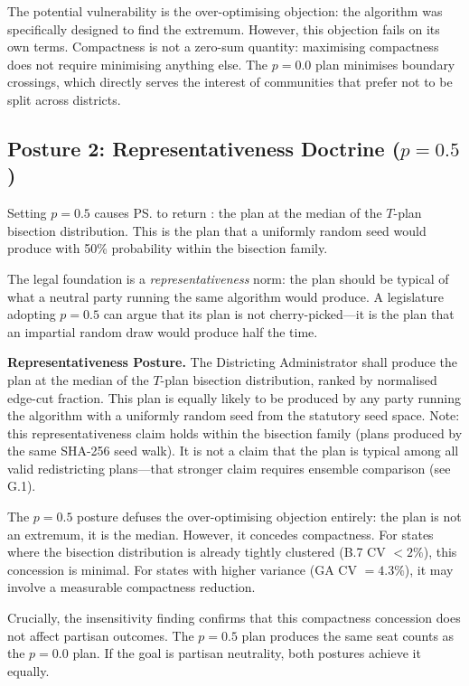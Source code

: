 The potential vulnerability is the over-optimising objection: the algorithm
was specifically designed to find the extremum.
However, this objection fails on its own terms.
Compactness is not a zero-sum quantity: maximising compactness does not
require minimising anything else.
The $p = 0.0$ plan minimises boundary crossings, which directly serves the
interest of communities that prefer not to be split across districts.

\subsection{Posture 2: Representativeness Doctrine ($p = 0.5$)}

Setting $p = 0.5$ causes \ps{} to return \ms{}: the plan at the median of
the $T$-plan bisection distribution.
This is the plan that a uniformly random seed would produce with 50\%
probability within the bisection family.

The legal foundation is a \emph{representativeness} norm: the plan should
be typical of what a neutral party running the same algorithm would produce.
A legislature adopting $p = 0.5$ can argue that its plan is not
cherry-picked---it is the plan that an impartial random draw would produce
half the time.

\begin{statute}
\textbf{Representativeness Posture.}
The Districting Administrator shall produce the plan at the median of the
$T$-plan bisection distribution, ranked by normalised edge-cut fraction.
This plan is equally likely to be produced by any party running the
algorithm with a uniformly random seed from the statutory seed space.
Note: this representativeness claim holds within the bisection family
(plans produced by the same SHA-256 seed walk).
It is not a claim that the plan is typical among all valid redistricting
plans---that stronger claim requires ensemble comparison (see G.1).
\end{statute}

The $p = 0.5$ posture defuses the over-optimising objection entirely: the
plan is not an extremum, it is the median.
However, it concedes compactness.
For states where the bisection distribution is already tightly clustered
(B.7 CV $< 2\%$), this concession is minimal.
For states with higher variance (GA CV $= 4.3\%$), it may involve a
measurable compactness reduction.

Crucially, the insensitivity finding confirms that this compactness concession
does not affect partisan outcomes.
The $p = 0.5$ plan produces the same seat counts as the $p = 0.0$ plan.
If the goal is partisan neutrality, both postures achieve it equally.

